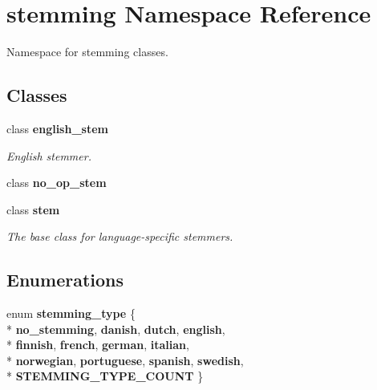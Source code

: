 \section{stemming Namespace Reference}
\label{namespacestemming}


Namespace for stemming classes.  


\subsection*{Classes}
\begin{DoxyCompactItemize}
\item 
class {\bf english\+\_\+stem}
\begin{DoxyCompactList}\small\item\em English stemmer. \end{DoxyCompactList}\item 
class {\bf no\+\_\+op\+\_\+stem}
\item 
class {\bf stem}
\begin{DoxyCompactList}\small\item\em The base class for language-\/specific stemmers. \end{DoxyCompactList}\end{DoxyCompactItemize}
\subsection*{Enumerations}
\begin{DoxyCompactItemize}
\item 
enum {\bfseries stemming\+\_\+type} \{ \\*
{\bfseries no\+\_\+stemming}, 
{\bfseries danish}, 
{\bfseries dutch}, 
{\bfseries english}, 
\\*
{\bfseries finnish}, 
{\bfseries french}, 
{\bfseries german}, 
{\bfseries italian}, 
\\*
{\bfseries norwegian}, 
{\bfseries portuguese}, 
{\bfseries spanish}, 
{\bfseries swedish}, 
\\*
{\bfseries S\+T\+E\+M\+M\+I\+N\+G\+\_\+\+T\+Y\+P\+E\+\_\+\+C\+O\+U\+NT}
 \}\label{namespacestemming_a2e4f4acbe03aa8d24c5fb10fbb6ad957}

\end{DoxyCompactItemize}
